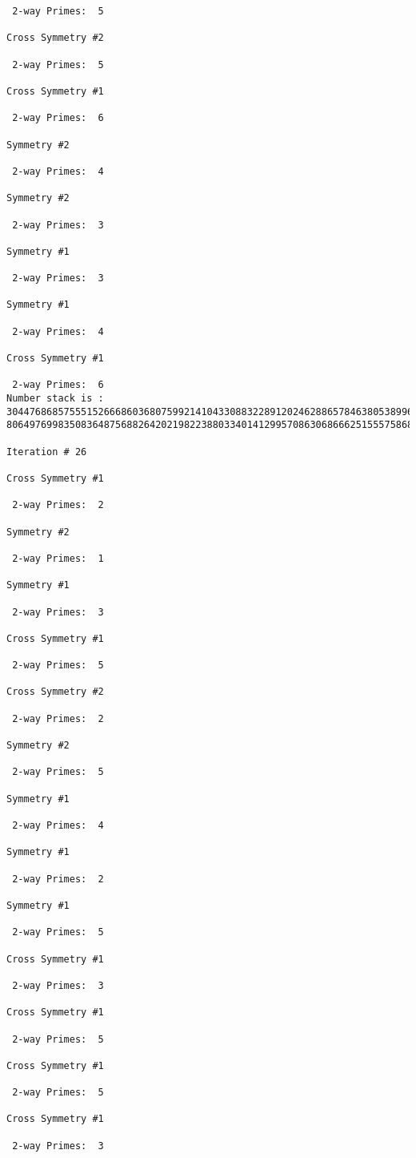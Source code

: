 {{{{\begin{verbatim}
 2-way Primes: 	5

Cross Symmetry #2

 2-way Primes: 	5

Cross Symmetry #1

 2-way Primes: 	6

Symmetry #2

 2-way Primes: 	4

Symmetry #2

 2-way Primes: 	3

Symmetry #1

 2-way Primes: 	3

Symmetry #1

 2-way Primes: 	4

Cross Symmetry #1

 2-way Primes: 	6
Number stack is :
30447686857555152666860368075992141043308832289120246288657846380538996794608835958544046240163340857
80649769983508364875688264202198223880334014129957086306866625155575868674403758043361042640445859538

Iteration #	26

Cross Symmetry #1

 2-way Primes: 	2

Symmetry #2

 2-way Primes: 	1

Symmetry #1

 2-way Primes: 	3

Cross Symmetry #1

 2-way Primes: 	5

Cross Symmetry #2

 2-way Primes: 	2

Symmetry #2

 2-way Primes: 	5

Symmetry #1

 2-way Primes: 	4

Symmetry #1

 2-way Primes: 	2

Symmetry #1

 2-way Primes: 	5

Cross Symmetry #1

 2-way Primes: 	3

Cross Symmetry #1

 2-way Primes: 	5

Cross Symmetry #1

 2-way Primes: 	5

Cross Symmetry #1

 2-way Primes: 	3


\end{verbatim}}}}}

